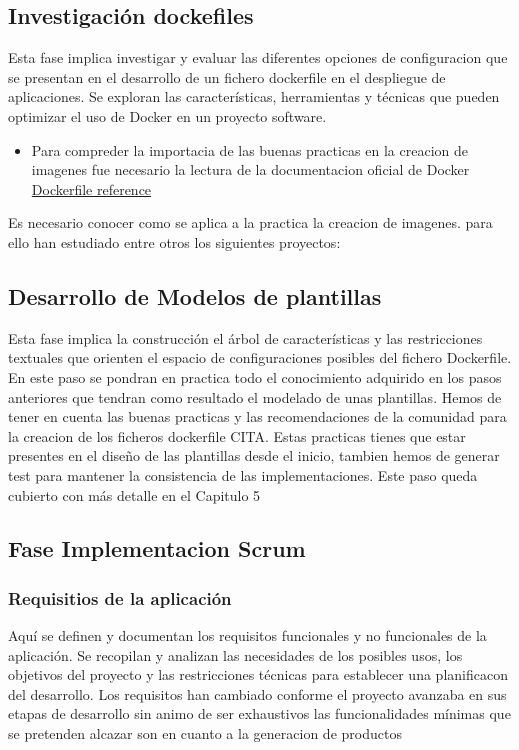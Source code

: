 \documentclass[12pt, a4paper, twoside]{article}
\begin{document}
\subsection{Investigación dockefiles}
Esta fase implica investigar y evaluar las diferentes opciones de configuracion que se presentan en el desarrollo de un fichero dockerfile en el 
despliegue de aplicaciones. Se exploran las características, herramientas y técnicas que pueden optimizar el uso de 
Docker en un proyecto software. 

\begin{itemize}
	\item Para compreder la importacia de las buenas practicas en la creacion de imagenes fue necesario la lectura de la documentacion oficial de Docker \href{https://docs.docker.com/reference/dockerfile/}{Dockerfile reference} \cite{dockerfile_reference}
\end{itemize}

Es necesario conocer como se aplica a la practica la creacion de imagenes. para ello han estudiado entre otros los siguientes proyectos:


\subsection{Desarrollo de Modelos de plantillas}
Esta fase implica la construcción el árbol de características y las restricciones textuales que orienten el espacio de 
configuraciones posibles del fichero Dockerfile. En este paso se pondran en practica todo el conocimiento adquirido en los pasos anteriores que 
tendran como resultado el modelado de unas plantillas. Hemos de tener en cuenta las buenas practicas y las recomendaciones de la comunidad para la creacion de los ficheros dockerfile CITA. 
Estas practicas tienes que estar presentes en el diseño de las plantillas desde el inicio, tambien hemos de generar test para mantener la consistencia de las implementaciones. 
Este paso queda cubierto con más detalle en el Capitulo 5


\subsection{Fase Implementacion Scrum}
\subsubsection{Requisitios de la aplicación }
Aquí se definen y documentan los requisitos funcionales y no funcionales de la aplicación. Se recopilan y analizan las 
necesidades de los posibles usos, los objetivos del proyecto y las restricciones técnicas para establecer una planificacon del desarrollo. 
Los requisitos han cambiado conforme el proyecto avanzaba en sus etapas de desarrollo
sin animo de ser exhaustivos las funcionalidades mínimas que se pretenden alcazar son en cuanto a la generacion de productos
\end{document}

